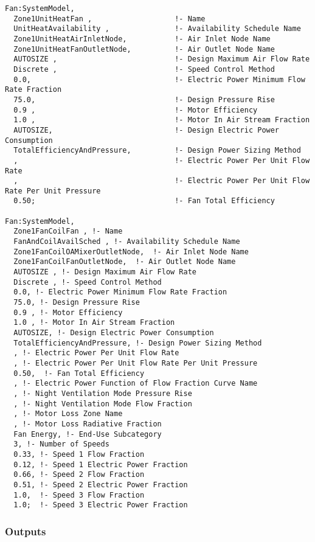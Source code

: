 \begin{lstlisting}
Fan:SystemModel,
  Zone1UnitHeatFan ,                   !- Name
  UnitHeatAvailability ,               !- Availability Schedule Name
  Zone1UnitHeatAirInletNode,           !- Air Inlet Node Name
  Zone1UnitHeatFanOutletNode,          !- Air Outlet Node Name
  AUTOSIZE ,                           !- Design Maximum Air Flow Rate
  Discrete ,                           !- Speed Control Method
  0.0,                                 !- Electric Power Minimum Flow Rate Fraction
  75.0,                                !- Design Pressure Rise
  0.9 ,                                !- Motor Efficiency
  1.0 ,                                !- Motor In Air Stream Fraction
  AUTOSIZE,                            !- Design Electric Power Consumption
  TotalEfficiencyAndPressure,          !- Design Power Sizing Method
  ,                                    !- Electric Power Per Unit Flow Rate
  ,                                    !- Electric Power Per Unit Flow Rate Per Unit Pressure
  0.50;                                !- Fan Total Efficiency

Fan:SystemModel,
  Zone1FanCoilFan , !- Name
  FanAndCoilAvailSched , !- Availability Schedule Name
  Zone1FanCoilOAMixerOutletNode,  !- Air Inlet Node Name
  Zone1FanCoilFanOutletNode,  !- Air Outlet Node Name
  AUTOSIZE , !- Design Maximum Air Flow Rate
  Discrete , !- Speed Control Method
  0.0, !- Electric Power Minimum Flow Rate Fraction
  75.0, !- Design Pressure Rise
  0.9 , !- Motor Efficiency
  1.0 , !- Motor In Air Stream Fraction
  AUTOSIZE, !- Design Electric Power Consumption
  TotalEfficiencyAndPressure, !- Design Power Sizing Method
  , !- Electric Power Per Unit Flow Rate
  , !- Electric Power Per Unit Flow Rate Per Unit Pressure
  0.50,  !- Fan Total Efficiency 
  , !- Electric Power Function of Flow Fraction Curve Name
  , !- Night Ventilation Mode Pressure Rise
  , !- Night Ventilation Mode Flow Fraction
  , !- Motor Loss Zone Name
  , !- Motor Loss Radiative Fraction 
  Fan Energy, !- End-Use Subcategory
  3, !- Number of Speeds
  0.33, !- Speed 1 Flow Fraction
  0.12, !- Speed 1 Electric Power Fraction
  0.66, !- Speed 2 Flow Fraction
  0.51, !- Speed 2 Electric Power Fraction
  1.0,  !- Speed 3 Flow Fraction
  1.0;  !- Speed 3 Electric Power Fraction

\end{lstlisting}

\subsubsection{Outputs}\label{outputs-fansysmodel}

